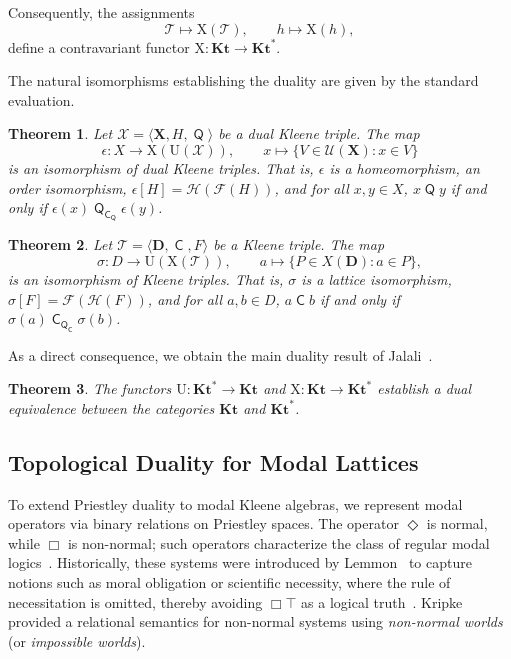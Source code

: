 \documentclass{article}
\newtheorem{theorem}{Theorem}[section]
\DeclareMathOperator{\con}{\mathsf{C}}
\DeclareMathOperator{\Q}{\mathsf{Q}}
\newcommand{\D}{\mathbf{D}}
\newcommand{\X}{\mathbf{X}}
\newcommand{\T}{\mathcal{T}}
\newcommand{\U}{\mathcal{U}}
\begin{document}
Consequently, the assignments
\[
\T \longmapsto \mathrm{X}(\T), \qquad h \longmapsto \mathrm{X}(h),
\]
define a contravariant functor $\mathrm{X} \colon \mathbf{Kt} \longrightarrow \mathbf{Kt}^{*}$.

The natural isomorphisms establishing the duality are given by the standard evaluation.

\begin{theorem}
\label{thm:epsilon-iso}
Let $\mathcal{X} = \langle \X, H, \Q \rangle$ be a dual Kleene triple. The map
\[
\epsilon \colon X \longrightarrow \mathrm{X}(\mathrm{U}(\mathcal{X})), \qquad x \mapsto \{V \in \U(\X) : x \in V\}
\]
is an isomorphism of dual Kleene triples. That is, $\epsilon$ is a homeomorphism, an order isomorphism, $\epsilon[H] = \mathcal{H}(\mathcal{F}(H))$, and for all $x,y \in X$, $ x\Q y$ if and only if $\epsilon(x) \Q_{\con_{\Q}}\epsilon(y)$.
\end{theorem}

\begin{theorem}
\label{thm:sigma-iso}
Let $\T = \langle \D, \con, F \rangle$ be a Kleene triple. The map
\[\sigma \colon D \longrightarrow \mathrm{U}(\mathrm{X}(\T)), \qquad a \mapsto \{P \in X(\D) : a \in P\},\]
is an isomorphism of Kleene triples. That is, $\sigma$ is a lattice isomorphism, $\sigma[F] = \mathcal{F}(\mathcal{H}(F))$, and for all $a,b \in D$, $a \con b$ if and only if $\sigma(a) \con_{\Q_{\con}} \sigma(b)$.
\end{theorem}

As a direct consequence, we obtain the main duality result of Jalali~\cite{jalali}.

\begin{theorem}
\label{thm:Kt-duality}
The functors $\mathrm{U} \colon \mathbf{Kt}^{*} \to \mathbf{Kt}$ and $\mathrm{X} \colon \mathbf{Kt} \to \mathbf{Kt}^{*}$ establish a dual equivalence between the categories $\mathbf{Kt}$ and $\mathbf{Kt}^{*}$.
\end{theorem}

\subsection{Topological Duality for Modal Lattices}
\label{subsec:topological-duality-modal-lattices}

To extend Priestley duality to modal Kleene algebras, we represent modal operators via binary relations on Priestley spaces. The operator $\Diamond$ is normal, while $\Box$ is non-normal; such operators characterize the class of regular modal logics~\cite[p.~234]{Chellas1980}. Historically, these systems were introduced by Lemmon~\cite{Lemmon1957} to capture notions such as moral obligation or scientific necessity, where the rule of necessitation is omitted, thereby avoiding $\Box \top$ as a logical truth~\cite{Lemmon1957, palmigiano2016}. Kripke~\cite{Kripke1965} provided a relational semantics for non-normal systems using \emph{non-normal worlds} (or \emph{impossible worlds}).
\end{document}
